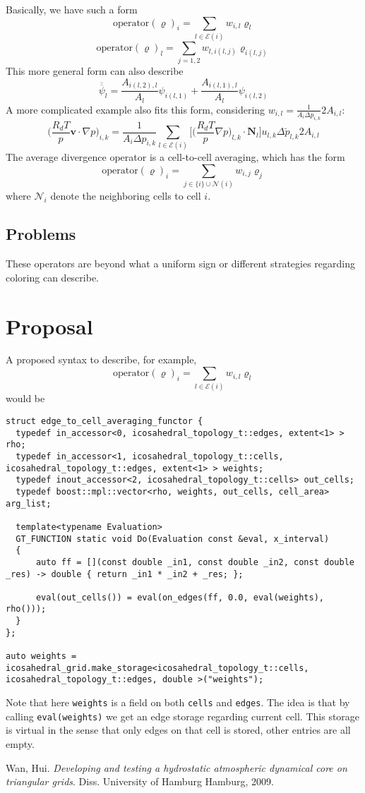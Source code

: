 \documentclass[12pt]{article}
\begin{document}
  Basically, we have such a form
  \[\text{operator}(\varrho)_i = \sum\limits_{l \in \mathcal{E}(i)}w_{i, l}\varrho_{l}\]
  \[\text{operator}(\varrho)_l = \sum\limits_{j=1,2}w_{l, i(l,j)}\varrho_{i(l,j)}\]
  This more general form can also describe
  \begin{equation}
    \overline{\overline\psi}_l = \frac{A_{i(l,2),l}}{A_l}\psi_{i(l,1)} + \frac{A_{i(l,1),l}}{A_l}\psi_{i(l,2)}
    \tag{3.51}
  \end{equation}
  A more complicated example also fits this form, considering $w_{i, l}=\frac{1}{A_i \Delta p_{i, k}}2A_{i,l}$:
  \begin{equation}
      \Big(\frac{R_dT}{p}\bm{v}\cdot\nabla p\Big)_{i, k} = \frac{1}{A_i \Delta p_{i, k}} \sum\limits_{l\in\mathcal{E}(i)}\bigg[\Big(\frac{R_dT}{p}\nabla p\Big)_{l, k}\cdot \bm{N}_l\bigg] u_{l,k} \Delta\breve{p}_{l,k}2A_{i,l}
      \tag{3.57}
    \end{equation}
  The average divergence operator is a cell-to-cell averaging, which has the form
  \[\text{operator}(\varrho)_i = \sum\limits_{j \in \{i\}\cup\mathcal{N}(i)}w_{i, j}\varrho_{j}\]
  where $\mathcal{N}_i$ denote the neighboring cells to cell $i$.

  \subsection{Problems}
  These operators are beyond what a uniform sign or different strategies regarding coloring can describe.

  \section{Proposal}
  A proposed syntax to describe, for example,
  \[\text{operator}(\varrho)_i = \sum\limits_{l \in \mathcal{E}(i)}w_{i, l}\varrho_{l}\]
  would be
  \begin{lstlisting}[frame=single]
struct edge_to_cell_averaging_functor {
  typedef in_accessor<0, icosahedral_topology_t::edges, extent<1> > rho;
  typedef in_accessor<1, icosahedral_topology_t::cells, icosahedral_topology_t::edges, extent<1> > weights;
  typedef inout_accessor<2, icosahedral_topology_t::cells> out_cells;
  typedef boost::mpl::vector<rho, weights, out_cells, cell_area> arg_list;

  template<typename Evaluation>
  GT_FUNCTION static void Do(Evaluation const &eval, x_interval)
  {
      auto ff = [](const double _in1, const double _in2, const double _res) -> double { return _in1 * _in2 + _res; };

      eval(out_cells()) = eval(on_edges(ff, 0.0, eval(weights), rho()));
  }
};

auto weights = icosahedral_grid.make_storage<icosahedral_topology_t::cells, icosahedral_topology_t::edges, double >("weights");
  \end{lstlisting}
Note that here \texttt{weights} is a field on both \texttt{cells} and \texttt{edges}. The idea is that by calling \texttt{eval(weights)} we get an edge storage regarding current cell. This storage is virtual in the sense that only edges on that cell is stored, other entries are all empty.



  \begin{thebibliography}{9}
  Wan, Hui. \textit{Developing and testing a hydrostatic atmospheric dynamical core on triangular grids}. Diss. University of Hamburg Hamburg, 2009.
  \end{thebibliography}
\end{document}

